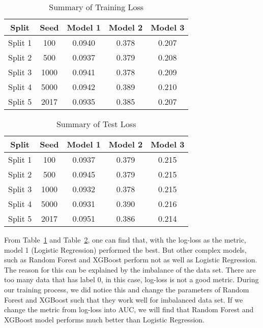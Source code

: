 \documentclass[12pt]{article}
\begin{document}
\begin{table}[htb]
 \caption{Summary of Training Loss} \label{result1}
 \vspace{0.1in}
\begin{center}
  \begin{tabular}{  c  c  c  c  c}
    \hline
    Split            & Seed        & Model 1    & Model 2    & Model 3 \\ \hline
    Split 1         & 100    &0.0940    &0.378    &0.207\\ \hline
    Split 2         & 500    &0.0937    &0.379    &0.208\\ \hline
    Split 3         & 1000    &0.0941    &0.378    &0.209\\ \hline
    Split 4         & 5000    &0.0942    &0.389    &0.210\\ \hline
    Split 5         & 2017    &0.0935    &0.385    &0.207\\ \hline
  \end{tabular}
\end{center}
\end{table}
\begin{table}[htb]
 \caption{Summary of Test Loss} \label{result2}
 \vspace{0.1in}
\begin{center}
  \begin{tabular}{  c  c  c  c  c}
    \hline
    Split            & Seed        & Model 1    & Model 2    & Model 3 \\ \hline
    Split 1         & 100    &0.0937    &0.379    &0.215\\ \hline
    Split 2         & 500    &0.0945    &0.379    &0.215\\ \hline
    Split 3         & 1000    &0.0932    &0.378    &0.215\\ \hline
    Split 4         & 5000    &0.0931    &0.390    &0.216\\ \hline
    Split 5         & 2017    &0.0951    &0.386    &0.214\\ \hline
  \end{tabular}
\end{center}
\end{table}


From Table~\ref{result1} and Table~\ref{result2}, one can find that, with the log-loss as the metric, model 1 (Logistic Regression) performed the best. But other complex models, such as Random Forest and XGBoost perform not as well as Logistic Regression. The reason for this can be explained by the imbalance of the data set. There are too many data that has label 0, in this case, log-loss is not a good metric. During our training process, we did notice this and change the parameters of Random Forest and XGBoost such that they work well for imbalanced data set. If we change the metric from log-loss into AUC, we will find that Random Forest and XGBoost model performs much better than Logistic Regression.
\end{document}
